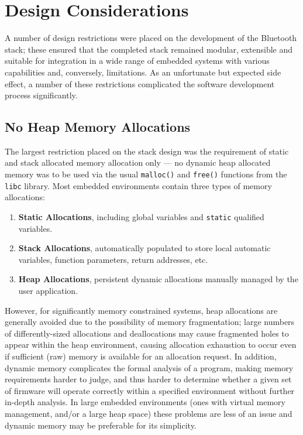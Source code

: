 \section{Design Considerations}

A number of design restrictions were placed on the development of the Bluetooth stack; these ensured that the completed stack remained modular, extensible and suitable for integration in a wide range of embedded systems with various capabilities and, conversely, limitations. As an unfortunate but expected side effect, a number of these restrictions complicated the software development process significantly.

\subsection{No Heap Memory Allocations}

The largest restriction placed on the stack design was the requirement of static and stack allocated memory allocation only --- no dynamic heap allocated memory was to be used via the usual \lstinline{malloc()} and \lstinline{free()} functions from the \texttt{libc} library. Most embedded environments contain three types of memory allocations:

\begin{enumerate}
	\item \textbf{Static Allocations}, including global variables and \lstinline{static} qualified variables.
	\item \textbf{Stack Allocations}, automatically populated to store local automatic variables, function parameters, return addresses, etc.
	\item \textbf{Heap Allocations}, persistent dynamic allocations manually managed by the user application.
\end{enumerate}

However, for significantly memory constrained systems, heap allocations are generally avoided due to the possibility of memory fragmentation; large numbers of differently-sized allocations and deallocations may cause fragmented holes to appear within the heap environment, causing allocation exhaustion to occur even if sufficient (raw) memory is available for an allocation request. In addition, dynamic memory complicates the formal analysis of a program, making memory requirements harder to judge, and thus harder to determine whether a given set of firmware will operate correctly within a specified environment without further in-depth analysis. In large embedded environments (ones with virtual memory management, and/or a large heap space) these problems are less of an issue and dynamic memory may be preferable for its simplicity.

